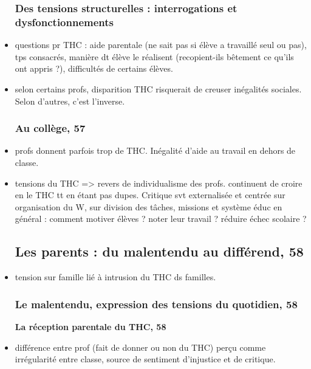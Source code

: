 \documentclass[12pt]{article}
\begin{document}
\begin{itemize}[label=]
\subsubsection{Des tensions structurelles : interrogations et dysfonctionnements}

\item questions pr THC : aide parentale (ne sait pas si élève a travaillé seul ou pas), tps consacrés, manière dt élève le réalisent (recopient-ils bêtement ce qu'ils ont appris ?), difficultés de certains élèves.\\

\item selon certains profs, disparition THC risquerait de creuser inégalités sociales. Selon d'autres, c'est l'inverse.

\subsubsection{Au collège, 57}

\item profs donnent parfois trop de THC. Inégalité d'aide au travail en dehors de classe.\\

\item tensions du THC => revers de individualisme des profs. continuent de croire en le THC tt en étant pas dupes. Critique svt externalisée et centrée sur organisation du W, sur division des tâches, missions et système éduc en général : comment motiver élèves ? noter leur travail ? réduire échec scolaire ?

\subsection{Les parents : du malentendu au différend, 58}

\item tension sur famille lié à intrusion du THC ds familles.

\subsubsection{Le malentendu, expression des tensions du quotidien, 58}

\textbf{La réception parentale du THC, 58} \\

\item différence entre prof (fait de donner ou non du THC) perçu comme irrégularité entre classe, source de sentiment d'injustice et de critique.\\


\end{itemize}
\end{document}
